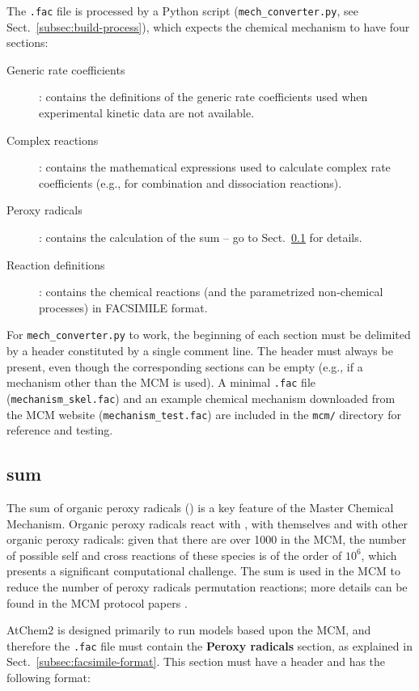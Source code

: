The \texttt{.fac} file is processed by a Python script
(\texttt{mech\_converter.py}, see Sect.~\ref{subsec:build-process}),
which expects the chemical mechanism to have four sections:

\begin{description}
\item[Generic rate coefficients] : contains the definitions of the
  generic rate coefficients used when experimental kinetic data are
  not available.
\item[Complex reactions] : contains the mathematical expressions used
  to calculate complex rate coefficients (e.g., for combination and
  dissociation reactions).
\item[Peroxy radicals] : contains the calculation of the  sum
  -- go to Sect.~\ref{subsec:ro2-sum} for details.
\item[Reaction definitions] : contains the chemical reactions (and the
  parametrized non-chemical processes) in FACSIMILE format.
\end{description}

For \texttt{mech\_converter.py} to work, the beginning of each section
must be delimited by a header constituted by a single comment line.
The header must always be present, even though the corresponding
sections can be empty (e.g., if a mechanism other than the MCM is
used). A minimal \texttt{.fac} file (\texttt{mechanism\_skel.fac}) and
an example chemical mechanism downloaded from the MCM website
(\texttt{mechanism\_test.fac}) are included in the \texttt{mcm/}
directory for reference and testing.

\subsection{ sum} \label{subsec:ro2-sum}

The sum of organic peroxy radicals () is a key feature of the
Master Chemical Mechanism. Organic peroxy radicals react with
, with themselves and with other organic peroxy radicals:
given that there are over 1000  in the MCM, the number of
possible self and cross reactions of these species is of the order of
$10^6$, which presents a significant computational challenge. The
 sum is used in the MCM to reduce the number of peroxy
radicals permutation reactions; more details can be found in the MCM
protocol papers \citep{jenkin_1997, saunders_2003}.

AtChem2 is designed primarily to run models based upon the MCM, and
therefore the \texttt{.fac} file must contain the \textbf{Peroxy radicals}
section, as explained in Sect.~\ref{subsec:facsimile-format}. This
section must have a header and has the following format:

